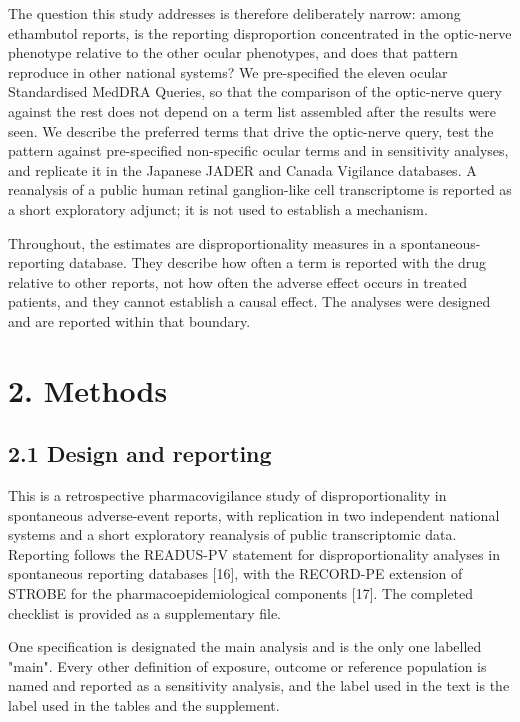\documentclass[12pt,a4paper]{article}
\begin{document}
The question this study addresses is therefore deliberately narrow: among ethambutol reports, is the reporting disproportion concentrated in the optic-nerve phenotype relative to the other ocular phenotypes, and does that pattern reproduce in other national systems? We pre-specified the eleven ocular Standardised MedDRA Queries, so that the comparison of the optic-nerve query against the rest does not depend on a term list assembled after the results were seen. We describe the preferred terms that drive the optic-nerve query, test the pattern against pre-specified non-specific ocular terms and in sensitivity analyses, and replicate it in the Japanese JADER and Canada Vigilance databases. A reanalysis of a public human retinal ganglion-like cell transcriptome is reported as a short exploratory adjunct; it is not used to establish a mechanism.

Throughout, the estimates are disproportionality measures in a spontaneous-reporting database. They describe how often a term is reported with the drug relative to other reports, not how often the adverse effect occurs in treated patients, and they cannot establish a causal effect. The analyses were designed and are reported within that boundary.

\section*{2. Methods}

\subsection*{2.1 Design and reporting}

This is a retrospective pharmacovigilance study of disproportionality in spontaneous adverse-event reports, with replication in two independent national systems and a short exploratory reanalysis of public transcriptomic data. Reporting follows the READUS-PV statement for disproportionality analyses in spontaneous reporting databases [16], with the RECORD-PE extension of STROBE for the pharmacoepidemiological components [17]. The completed checklist is provided as a supplementary file.

One specification is designated the main analysis and is the only one labelled "main". Every other definition of exposure, outcome or reference population is named and reported as a sensitivity analysis, and the label used in the text is the label used in the tables and the supplement.
\end{document}
